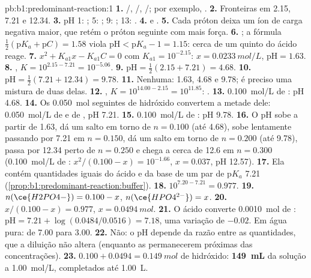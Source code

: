 \begin{solution}{pb:b1:predominant-reaction:1}
\textbf{1.} /, /,
/; por exemplo, .
\textbf{2.} Fronteiras em 2.15, 7.21 e 12.34.
\textbf{3.} pH 1: ; 5: ; 9: ; 13:
.
\textbf{4.}  e .
\textbf{5.} Cada próton deixa um íon de carga negativa maior, que retém o
próton seguinte com mais força.
\textbf{6.} ; a fórmula
$\frac12(\mathrm{p}K_a + \mathrm{p}C) = 1.58$ viola $\mathrm{pH} <
\mathrm{p}K_a - 1 = 1.15$: cerca de um quinto do ácido reage.
\textbf{7.} $x^2 + K_{a1}x - K_{a1}C = 0$ com $K_{a1} = 10^{-2.15}$: $x =
\qty{0.0233}{mol/L}$, $\mathrm{pH} = 1.63$.
\textbf{8.} , $K = 10^{2.15 - 7.21} =
10^{-5.06}$.
\textbf{9.} $\mathrm{pH} = \frac12(2.15 + 7.21) = 4.68$.
\textbf{10.} $\mathrm{pH} = \frac12(7.21 + 12.34) = 9.78$.
\textbf{11.} Nenhuma: 1.63, 4.68 e 9.78; é preciso uma mistura de duas
delas.
\textbf{12.} , $K = 10^{14.00 - 2.15} =
10^{11.85}$: .
\textbf{13.} \qty{0.100}{mol/L} de : pH 4.68.
\textbf{14.} Os \qty{0.050}{mol} seguintes de hidróxido convertem a
metade dele: \qty{0.050}{mol/L} de  e de , pH 7.21.
\textbf{15.} \qty{0.100}{mol/L} de : pH 9.78.
\textbf{16.} O pH sobe a partir de 1.63, dá um salto em torno de
$n = 0.100$ (até 4.68), sobe lentamente passando por 7.21 em
$n = 0.150$, dá um salto em torno de $n = 0.200$ (até
9.78), passa por 12.34 perto de $n = 0.250$ e chega a cerca de 12.6 em $n = 0.300$ (\qty{0.100}{mol/L} de : $x^2/(0.100 - x) = 10^{-1.66}$, $x = 0.037$, pH 12.57).
\textbf{17.} Ela contém quantidades iguais do ácido e da base de um par de
$\mathrm{p}K_a$ 7.21 (\cref{prop:b1:predominant-reaction:buffer}).
\textbf{18.} $10^{7.20 - 7.21} = 0.977$.
\textbf{19.} $n(\ce{H2PO4-}) = 0.100 - x$, $n(\ce{HPO4^{2-}}) = x$.
\textbf{20.} $x/(0.100 - x) = 0.977$, $x = \qty{0.0494}{mol}$.
\textbf{21.} O ácido converte \qty{0.0010}{mol} de :
$\mathrm{pH} = 7.21 + \log(0.0484/0.0516) = 7.18$, uma variação de
$-0.02$. Em água pura: de 7.00 para 3.00.
\textbf{22.} Não: o pH depende da razão entre as quantidades, que a
diluição não altera (enquanto as  permanecerem próximas das
concentrações).
\textbf{23.} $0.100 + 0.0494 = \qty{0.149}{mol}$ de hidróxido: \textbf{\qty{149}{mL}}
da solução a \qty{1.00}{mol/L}, completados até \qty{1.00}{L}.
\end{solution}
